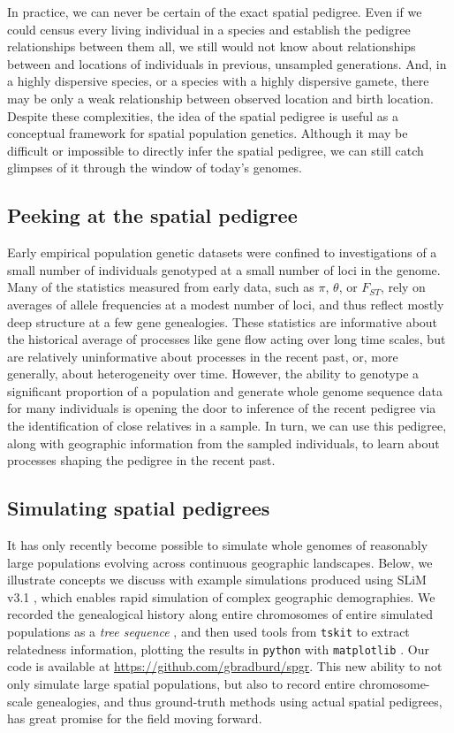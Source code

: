 \documentclass{ar-1col}
\renewcommand{\emph}[1]{{\textit{#1}}}
\begin{document}
In practice, we can never be certain of the exact spatial pedigree.
Even if we could census every living individual in a species
and establish the pedigree relationships between them all,
we still would not know about relationships between
and locations of individuals in previous, unsampled generations.
And, in a highly dispersive species,
or a species with a highly dispersive gamete,
there may be only a weak relationship between observed location and birth location.
Despite these complexities,
the idea of the spatial pedigree is useful
as a conceptual framework for spatial population genetics.
Although it may be difficult or impossible
to directly infer the spatial pedigree,
we can still catch glimpses of it through the window of today's genomes.

\subsection{Peeking at the spatial pedigree}
Early empirical population genetic datasets were confined to 
investigations of a small number of individuals 
genotyped at a small number of loci in the genome.
Many of the statistics measured from early data, 
such as $\pi$, $\theta$, or $F_{ST}$,
rely on averages of allele frequencies
at a modest number of loci,
and thus reflect mostly deep structure at a few gene genealogies.
These statistics are informative about 
the historical average of processes like gene flow acting over long time scales, 
but are relatively uninformative about processes in the recent past, 
or, more generally, about heterogeneity over time.
However, the ability to genotype a significant proportion of a population 
and generate whole genome sequence data for many individuals 
is opening the door to inference of the recent pedigree 
via the identification of close relatives in a sample.
In turn, we can use this pedigree, 
along with geographic information from the sampled individuals, 
to learn about processes shaping the pedigree in the recent past.

\subsection{Simulating spatial pedigrees}

It has only recently become possible to simulate whole genomes
of reasonably large populations
evolving across continuous geographic landscapes.
Below, 
we illustrate concepts we discuss with example simulations 
produced using SLiM v3.1 \citep{haller2018forward},
which enables rapid simulation of complex geographic demographies.
We recorded the genealogical history along entire chromosomes
of entire simulated populations
as a \emph{tree sequence} \citep{haller2018treesequence},
and then used tools from \texttt{tskit} \citep{kelleher2018efficient} 
to extract relatedness information,
plotting the results in \texttt{python} with \texttt{matplotlib} \citep{hunter2007matplotlib}.
Our code is available at \url{https://github.com/gbradburd/spgr}.
This new ability to not only simulate large spatial populations,
but also to record entire chromosome-scale genealogies,
and thus ground-truth methods using actual spatial pedigrees,
has great promise for the field moving forward.
\end{document}
